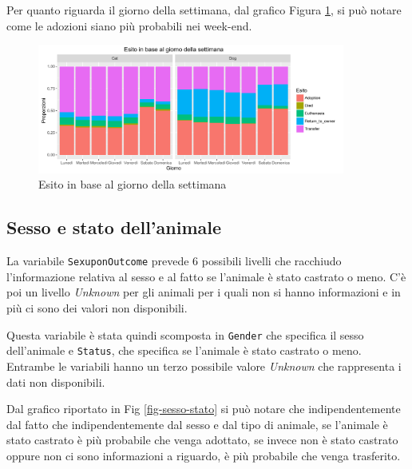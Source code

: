 Per quanto riguarda il giorno della settimana, dal grafico Figura \ref{fig-dow}, si può notare come le adozioni siano più probabili nei week-end.

\begin{figure}[htbp]
	\centering
	\includegraphics[width=0.9\textwidth]{./grafici/esito_week.pdf}
	\caption{Esito in base al giorno della settimana}\label{fig-dow}
\end{figure}

\subsection{Sesso e stato dell'animale}

La variabile \texttt{SexuponOutcome} prevede 6 possibili livelli che racchiudo l'informazione relativa al sesso e al fatto se l'animale è stato castrato o meno. C'è poi un livello \textit{Unknown} per gli animali per i quali non si hanno informazioni e in più ci sono dei valori non disponibili.

Questa variabile è stata quindi scomposta in \texttt{Gender} che specifica il sesso dell'animale e \texttt{Status}, che specifica se l'animale è stato castrato o meno. Entrambe le variabili hanno un terzo possibile valore \textit{Unknown} che rappresenta i dati non disponibili.

Dal grafico riportato in Fig \ref{fig-sesso-stato} si può notare che indipendentemente dal fatto che indipendentemente dal sesso e dal tipo di animale, se l'animale è stato castrato è più probabile che venga adottato, se invece non è stato castrato oppure non ci sono informazioni a riguardo, è più probabile che venga trasferito.

